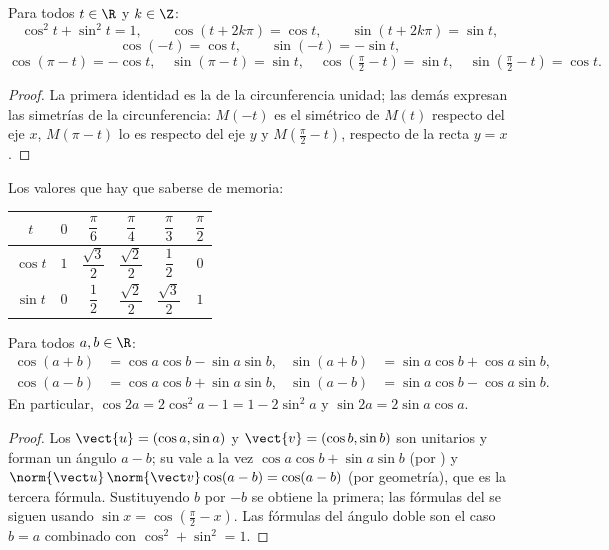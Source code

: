 \begin{proposition}\label{prop:g12:trigo:identities}
Para todos $t \in \R$ y $k \in \Z$:
\[
\cos^2 t + \sin^2 t = 1, \qquad
\cos(t + 2k\pi) = \cos t, \qquad
\sin(t + 2k\pi) = \sin t,
\]
\[
\cos(-t) = \cos t, \qquad \sin(-t) = -\sin t,
\]
\[
\cos(\pi - t) = -\cos t, \quad \sin(\pi - t) = \sin t, \quad
\cos\left(\tfrac{\pi}{2} - t\right) = \sin t, \quad
\sin\left(\tfrac{\pi}{2} - t\right) = \cos t .
\]
\end{proposition}

\begin{proof}
La primera identidad es la  de la circunferencia unidad; las demás
expresan las simetrías de la circunferencia: $M(-t)$ es el simétrico de
$M(t)$ respecto del eje $x$, $M(\pi - t)$ lo es respecto del eje $y$ y
$M(\frac\pi2 - t)$, respecto de la recta $y = x$.
\end{proof}

Los valores que hay que saberse de memoria:
\begin{center}
\begin{tabular}{c|ccccc}
$t$ & $0$ & $\dfrac{\pi}{6}$ & $\dfrac{\pi}{4}$ & $\dfrac{\pi}{3}$ & $\dfrac{\pi}{2}$\\[6pt]
\hline\rule{0pt}{14pt}%
$\cos t$ & $1$ & $\dfrac{\sqrt3}{2}$ & $\dfrac{\sqrt2}{2}$ & $\dfrac12$ & $0$\\[6pt]
$\sin t$ & $0$ & $\dfrac12$ & $\dfrac{\sqrt2}{2}$ & $\dfrac{\sqrt3}{2}$ & $1$
\end{tabular}
\end{center}

\begin{proposition}\label{prop:g12:trigo:addition}
Para todos $a, b \in \R$:
\begin{align*}
\cos(a+b) &= \cos a \cos b - \sin a \sin b, &
\sin(a+b) &= \sin a \cos b + \cos a \sin b,\\
\cos(a-b) &= \cos a \cos b + \sin a \sin b, &
\sin(a-b) &= \sin a \cos b - \cos a \sin b.
\end{align*}
En particular, $\cos 2a = 2\cos^2 a - 1 = 1 - 2\sin^2 a$ y
$\sin 2a = 2 \sin a \cos a$.
\end{proposition}

\begin{proof}
Los  $\vect{u} = (\cos a, \sin a)$ y $\vect{v} = (\cos b, \sin b)$
son unitarios y forman un ángulo $a - b$; su  vale a la vez
$\cos a\cos b + \sin a \sin b$ (por ) y
$\norm{\vect u}\,\norm{\vect v}\cos(a-b) = \cos(a - b)$ (por geometría),
que es la tercera fórmula. Sustituyendo $b$ por $-b$ se obtiene la primera;
las fórmulas del  se siguen usando $\sin x = \cos(\frac\pi2 - x)$. Las
fórmulas del ángulo doble son el caso $b = a$ combinado con
$\cos^2 + \sin^2 = 1$.
\end{proof}

